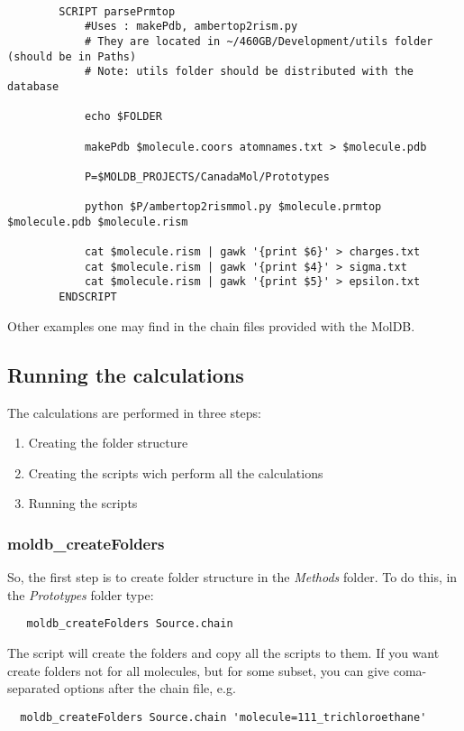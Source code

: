 \documentclass[12pt]{article}
\begin{document}
\begin{verbatim}

		SCRIPT parsePrmtop
			#Uses : makePdb, ambertop2rism.py
			# They are located in ~/460GB/Development/utils folder (should be in Paths)
			# Note: utils folder should be distributed with the database

			echo $FOLDER

			makePdb $molecule.coors atomnames.txt > $molecule.pdb

			P=$MOLDB_PROJECTS/CanadaMol/Prototypes

			python $P/ambertop2rismmol.py $molecule.prmtop $molecule.pdb $molecule.rism

			cat $molecule.rism | gawk '{print $6}' > charges.txt
			cat $molecule.rism | gawk '{print $4}' > sigma.txt
			cat $molecule.rism | gawk '{print $5}' > epsilon.txt
		ENDSCRIPT			
\end{verbatim}
Other examples one may find in the chain files provided with the MolDB.

\subsection{Running the calculations}

The calculations are performed in three steps: 
\begin{enumerate}
\item Creating the folder structure
\item Creating the scripts wich perform all the calculations
\item Running the scripts
\end{enumerate}

\subsubsection{moldb\_createFolders}

So, the first step is to create folder structure in the \emph{Methods} folder.
To do this, in the \emph{Prototypes} folder type:
\begin{verbatim}
   moldb_createFolders Source.chain
\end{verbatim} 

The script will create the folders and copy all the scripts to them.
If you want create folders not for all molecules, but for some subset, you can give coma-separated options after the chain file, e.g.
\begin{verbatim}
  moldb_createFolders Source.chain 'molecule=111_trichloroethane'
\end{verbatim}
\end{document}
